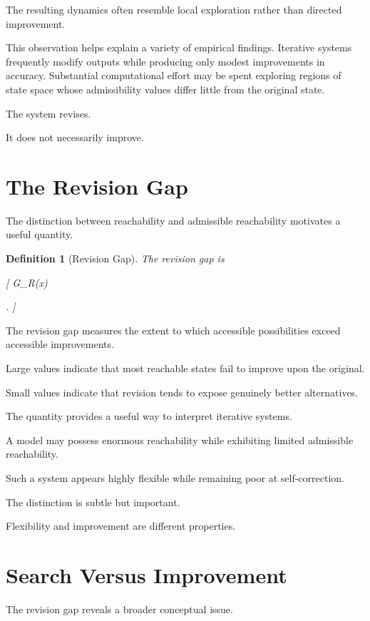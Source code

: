 \documentclass[11pt,oneside,openany]{book}
\newtheorem{definition}{Definition}[chapter] \newtheorem{theorem}{Theorem}[chapter] \newtheorem{proposition}{Proposition}[chapter] \newtheorem{lemma}{Lemma}[chapter] \newtheorem{corollary}{Corollary}[chapter] \newtheorem{remark}{Remark}[chapter]
\newcommand{\Vol}{\operatorname{Vol}} \newcommand{\dist}{\operatorname{dist}}
\begin{document}
The resulting dynamics often resemble local exploration rather than directed improvement.

This observation helps explain a variety of empirical findings. Iterative systems frequently modify outputs while producing only modest improvements in accuracy. Substantial computational effort may be spent exploring regions of state space whose admissibility values differ little from the original state.

The system revises.

It does not necessarily improve.

\section{The Revision Gap}

The distinction between reachability and admissible reachability motivates a useful quantity.

\begin{definition}[Revision Gap]

The revision gap is

[
G_R(x)

\frac{
\Vol(R(x))
}{
\Vol(R_A(x))
}.
]

\end{definition}

The revision gap measures the extent to which accessible possibilities exceed accessible improvements.

Large values indicate that most reachable states fail to improve upon the original.

Small values indicate that revision tends to expose genuinely better alternatives.

The quantity provides a useful way to interpret iterative systems.

A model may possess enormous reachability while exhibiting limited admissible reachability.

Such a system appears highly flexible while remaining poor at self-correction.

The distinction is subtle but important.

Flexibility and improvement are different properties.

\section{Search Versus Improvement}

The revision gap reveals a broader conceptual issue.
\end{document}
